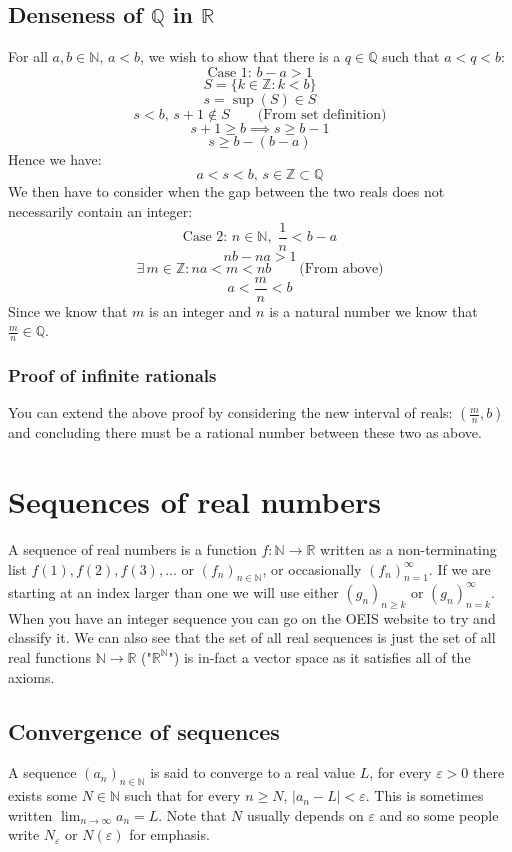 \documentclass[12pt]{article}
\newcommand{\seq}[2]{(#1_#2)_{#2\in\mathbb{N}}}
\begin{document}
\subsection*{Denseness of \(\mathbb{Q}\) in \(\mathbb{R}\)}
For all \(a,b\in\mathbb{N},\,a<b\), we wish to show that there is a \(q\in\mathbb{Q}\) such that \(a<q<b\):
\[\text{Case 1: }b-a>1\]
\[S=\{k\in\mathbb{Z}:k<b\}\]
\[s=\sup(S)\in S\]
\[s<b,\,s+1\notin S\qquad\text{(From set definition)}\]
\[s+1\geq b\implies s\geq b-1\]
\[s\geq b-(b-a)\]
Hence we have:
\[a<s<b,\,s\in\mathbb{Z\subset\mathbb{Q}}\]
We then have to consider when the gap between the two reals does not necessarily contain an integer:
\[\text{Case 2: } n\in\mathbb{N},\;\frac{1}{n}<b-a\]
\[nb-na>1\]
\[\exists\,m\in\mathbb{Z}:na<m<nb\qquad\text{(From above)}\]
\[a<\frac{m}{n}<b\]
Since we know that \(m\) is an integer and \(n\) is a natural number we know that \(\frac{m}{n}\in\mathbb{Q}\).
\subsubsection*{Proof of infinite rationals}
You can extend the above proof by considering the new interval of reals: \(\left(\frac{m}{n},b\right)\) and concluding there must be a rational number between these two as above.
\section{Sequences of real numbers}
A sequence of real numbers is a function \(f:\mathbb{N}\to\mathbb{R}\) written as a non-terminating list \(f(1),f(2),f(3),...\) or \((f_n)_{n\in\mathbb{N}}\), or occasionally \((f_{n})_{n=1}^\infty\). If we are starting at an index larger than one we will use either \((g_n)_{n\geq k}\) or \((g_{n})_{n=k}^\infty\). When you have an integer sequence you can go on the OEIS website to try and classify it. We can also see that the set of all real sequences is just the set of all real functions \(\mathbb{N}\to\mathbb{R}\) ("\(\mathbb{R}^\mathbb{N}\)") is in-fact a vector space as it satisfies all of the axioms.
\subsection*{Convergence of sequences}
A sequence \(\seq{a}{n}\) is said to converge to a real value \(L\), for every \(\varepsilon>0\) there exists some \(N\in\mathbb{N}\) such that for every \(n\geq N\), \(\vert a_n-L\vert <\varepsilon\). This is sometimes written \(\lim_{n\to\infty}a_n=L\). Note that \(N\) usually depends on \(\varepsilon\) and so some people write \(N_\varepsilon\) or \(N(\varepsilon)\) for emphasis.
\end{document}
